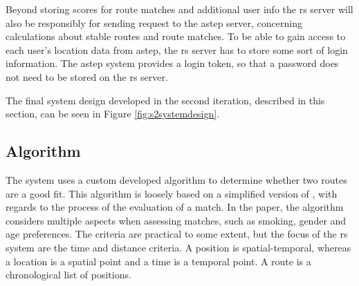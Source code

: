 

Beyond storing scores for route matches and additional user info the \gls{rs} server will also be responsibly for sending request to the \gls{astep} server, concerning calculations about stable routes and route matches.
To be able to gain access to each user's location data from \gls{astep}, the \gls{rs} server has to store some sort of login information.
The \gls{astep} system provides a login token, so that a password does not need to be stored on the \gls{rs} server.


The final system design developed in the second iteration, described in this section, can be seen in Figure \ref{fig:s2systemdesign}.



\subsection{Algorithm}
The system uses a custom developed algorithm to determine whether two routes are a good fit.
This algorithm is loosely based on a simplified version of \citet{ghoseiri2011real}, with regards to the process of the evaluation of a match.
In the paper, the algorithm considers multiple aspects when assessing matches, such as smoking, gender and age preferences.
The criteria are practical to some extent, but the focus of the \gls{rs} system are the time and distance criteria.
A position is spatial-temporal, whereas a location is a spatial point and a time is a temporal point.
A route is a chronological list of positions.
\DIFaddbegin {}\DIFaddend 

